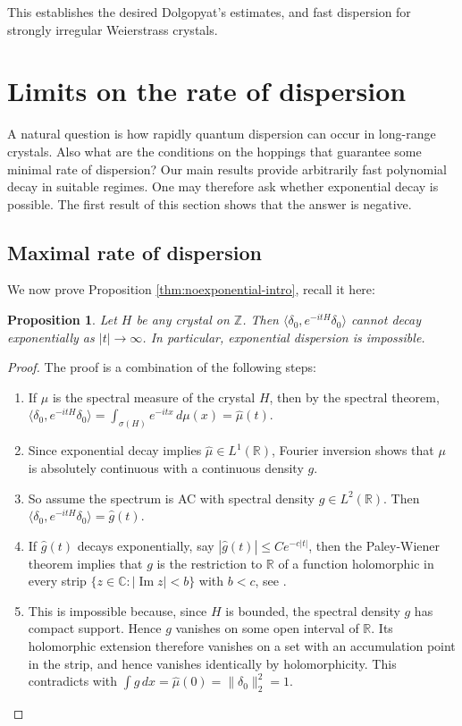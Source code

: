 \documentclass[11pt]{amsart}
\theoremstyle{plain}
\newtheorem{proposition}[theorem]{Proposition}
\theoremstyle{definition}
\numberwithin{equation}{section}
\begin{document}
This establishes the desired  Dolgopyat's estimates, and fast dispersion for strongly irregular Weierstrass crystals.




\section{Limits on the rate of dispersion}  \label{sec:maximal-dispersion}

A natural question is how rapidly quantum dispersion can occur in long-range crystals. Also what are the conditions on the hoppings that guarantee some minimal rate of dispersion? Our main results provide arbitrarily fast polynomial decay in suitable regimes. One may therefore ask whether exponential decay is possible. The first result of this section shows that the answer is negative.

\subsection{Maximal rate of dispersion}

We now prove Proposition \ref{thm:noexponential-intro}, recall it here:

\begin{proposition}\label{thm:exponential}
Let $H$ be any crystal on $\mathbb Z$. Then $\langle \delta_0,e^{-itH}\delta_0\rangle$ cannot decay exponentially as $|t|\to\infty$. In particular, exponential dispersion is impossible.
\end{proposition}
\begin{proof}
The proof is a combination of the following steps:
    \begin{enumerate}
        \item If $\mu$ is the spectral measure of the crystal $H$, then by the spectral theorem, $\langle \delta_0,e^{-itH}\delta_0\rangle = \int_{\sigma(H)} e^{-itx}\,d\mu(x) = \widehat{\mu}(t)$.
        \item Since exponential decay implies $\widehat{\mu}\in L^1(\mathbb R)$, Fourier inversion shows that $\mu$ is absolutely continuous with a continuous density $g$.
        \item So assume the spectrum is AC with spectral density $g \in L^2(\mathbb R)$. Then $\langle \delta_0,e^{-itH}\delta_0\rangle = \widehat{g}(t)$.
        \item If $\widehat{g}(t)$ decays exponentially, say $|\widehat{g}(t)|\leq Ce^{-c|t|}$, then the Paley-Wiener theorem implies that $g$ is the restriction to $\mathbb R$ of a function holomorphic in every strip $\{z\in\mathbb C:|\operatorname{Im}z|<b\}$ with $b<c$, see \cite[Chapter~4]{SteinShakarchiComplex}.
        \item This is impossible because, since $H$ is bounded, the spectral density $g$ has compact support. Hence $g$ vanishes on some open interval of $\mathbb R$. Its holomorphic extension therefore vanishes on a set with an accumulation point in the strip, and hence vanishes identically by holomorphicity. This contradicts with $\int g\,dx=\widehat{\mu}(0)=\|\delta_0\|_2^2=1$.
    \end{enumerate}
    
    \end{proof}
\end{document}
